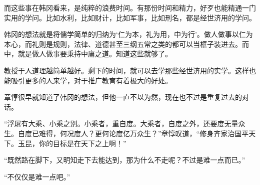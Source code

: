 而这些事在韩冈看来，是纯粹的浪费时间。有那份时间和精力，好歹也能精通一门实用的学问。比如水利，比如财计，比如军事，比如刑名，都是经世济用的学问。

韩冈的想法就是将儒学简单的归纳为‘仁为本，礼为用，中为行’。做人做事以仁为本心，而礼则是规则，法律、道德甚至三纲五常之类的都可以当框子装进去。而中，就是做人做事要秉持中庸之道。知道这些就够了。

教授于人道理越简单越好。剩下的时间，就可以去学那些经世济用的实学。这样也能吸引更多的人来学，对于推广教育有着极大的好处。

章惇很早就知道了韩冈的想法，但他一直不以为然，现在也不过是重复过去的对话。

“浮屠有大乘、小乘之别。小乘者，重自度。大乘者，自度之外，还要度无量众生。自度已难得，何况度人？更何论度亿万众生？”章惇叹道，“修身齐家治国平天下。玉昆，你的目标是在天下之上啊！”

“既然路在脚下，又明知走下去能达到，那为什么不走呢？不过是难一点而已。”

“不仅仅是难一点吧。”

